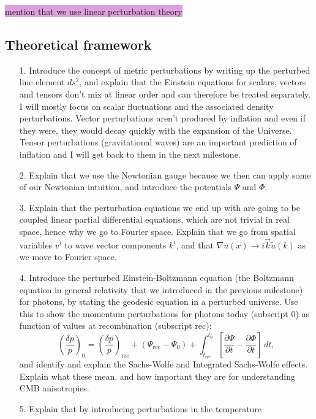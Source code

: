 \documentclass{aa}
\begin{document}
\colorbox{Plum}{mention that we use linear perturbation theory}


\subsection{Theoretical framework}\label{subsec: III theory}

\begin{enumerate}
  \item [1.] Introduce the concept of metric perturbations by writing up the perturbed line element $ds^2$, and explain that the Einstein equations for scalars, vectors and tensors don't mix at linear order and can therefore be treated separately. I will mostly focus on scalar fluctuations and the associated density perturbations. Vector perturbations aren't produced by inflation and even if they were, they would decay quickly with the expansion of the Universe. Tensor perturbations (gravitational waves) are an important prediction of inflation and I will get back to them in the next milestone. 
  \item [2.] Explain that we use the Newtonian gauge because we then can apply some of our Newtonian intuition, and introduce the potentials $\Psi$ and $\Phi$. 
  \item [3.] Explain that the perturbation equations we end up with are going to be coupled linear partial differential equations, which are not trivial in real space, hence why we go to Fourier space. Explain that we go from spatial variables $v^i$ to wave vector components $k^i$, and that $\nabla u(x)\to i\vec{k}\tilde{u}(k)$ as we move to Fourier space.
  \item [4.] Introduce the perturbed Einstein-Boltzmann equation (the Boltzmann equation in general relativity that we introduced in the previous milestone) for photons, by stating the geodesic equation in a perturbed universe. Use this to show the momentum perturbations for photons today (subscript 0) as function of values at recombination (subscript rec): 
  \begin{equation}
    \left(\frac{\delta p}{p}\right)_0 = \left(\frac{\delta p}{p}\right)_\text{rec} + \left(\Psi_\text{rec} - \Psi_0\right) + \int_{t_\text{rec}}^{t_0}\left[\frac{\partial\Psi}{\partial t} - \frac{\partial \Phi}{\partial t} \right]\,dt,
  \end{equation}
  and identify and explain the Sachs-Wolfe and Integrated Sachs-Wolfe effects. Explain what these mean, and how important they are for understanding CMB anisotropies.
  \item [5.] Explain that by introducing perturbations in the temperature 

\end{enumerate}
\end{document}
